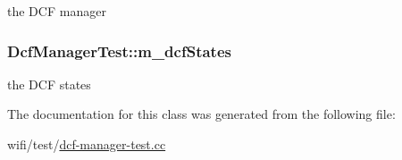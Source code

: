 the D\+CF manager 

\subsubsection[{\texorpdfstring{m\+\_\+dcf\+States}{m_dcfStates}}]{ Dcf\+Manager\+Test\+::m\+\_\+dcf\+States\hspace{0.3cm}{\ttfamily [private]}}\hypertarget{classDcfManagerTest_a77f7d700a37795d1d31614594e6a659e}{}\label{classDcfManagerTest_a77f7d700a37795d1d31614594e6a659e}


the D\+CF states 



The documentation for this class was generated from the following file\+:\begin{DoxyCompactItemize}
\item 
wifi/test/\hyperlink{dcf-manager-test_8cc}{dcf-\/manager-\/test.\+cc}\end{DoxyCompactItemize}
